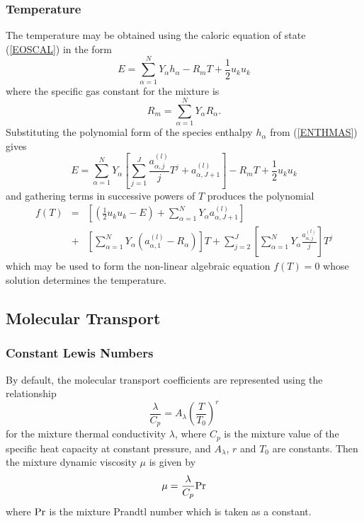 \documentclass[dvips]{article}
\begin{document}
\subsubsection{Temperature}
The temperature may be obtained using the caloric equation of state
(\ref{EOSCAL}) in the form
\begin{equation}
E = \sum_{\alpha=1}^{N} Y_{\alpha} h_{\alpha} - R_{m}T +
\frac{1}{2}u_{k}u_{k}
\end{equation}
where the specific gas constant for the mixture is 
\begin{equation}
R_{m} = \sum_{\alpha=1}^{N} Y_{\alpha} R_{\alpha}.
\end{equation}
Substituting the polynomial form of the species enthalpy $h_{\alpha}$
from (\ref{ENTHMAS}) gives
\begin{equation}
E = \sum_{\alpha=1}^{N} Y_{\alpha}\left[
\sum_{j=1}^{J} \frac{a_{\alpha,j}^{(l)}}{j}T^{j} + a_{\alpha,J+1}^{(l)}
\right] - R_{m}T + \frac{1}{2}u_{k}u_{k}
\end{equation}
and gathering terms in successive powers of $T$ produces the polynomial
\begin{eqnarray}
f(T) & = & \left[
\left(\frac{1}{2}u_{k}u_{k} - E\right)
+ \sum_{\alpha=1}^{N} Y_{\alpha}a_{\alpha,J+1}^{(l)}
\right]\nonumber\\
& + & \left[
\sum_{\alpha=1}^{N} Y_{\alpha}\left(a_{\alpha,1}^{(l)}-R_{\alpha}\right)
\right]T
+\sum_{j=2}^{J}\left[
\sum_{\alpha=1}^{N} Y_{\alpha}\frac{a_{\alpha,j}^{(l)}}{j}
\right]T^{j}
\label{TEMPERPOLY}
\end{eqnarray}
which may be used to form the non-linear algebraic equation $f(T)=0$ whose
solution determines the temperature.

\subsection{Molecular Transport}
\label{SEC:MOLTRANS}
\subsubsection{Constant Lewis Numbers}
By default, the molecular transport coefficients are represented using
the relationship \cite{SmookeGiovangigli}
\begin{equation}
\frac{\lambda}{C_{p}} = A_{\lambda}\left(\frac{T}{T_{0}}\right)^{r}
\label{TRANSRELAT}
\end{equation}
for the mixture thermal conductivity $\lambda$, where $C_{p}$ is the
mixture value of the specific heat capacity at constant pressure,
and $A_{\lambda}$,
$r$ and $T_{0}$ are constants.  Then the mixture dynamic viscosity $\mu$
is given by
\begin{equation}
\mu = \frac{\lambda}{C_{p}}{\rm Pr}
\label{VISCRELAT}
\end{equation}
where ${\rm Pr}$ is the mixture Prandtl number which is taken as a constant.
\\[2mm]
\end{document}
